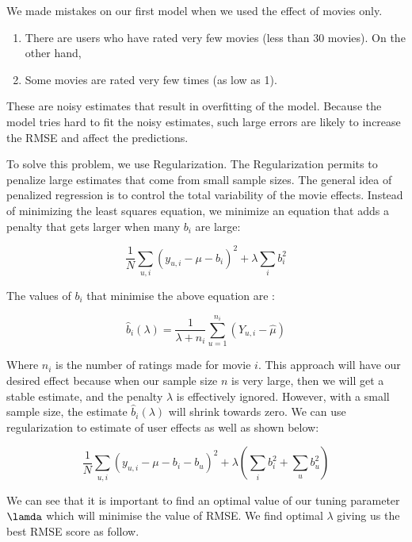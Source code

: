 \documentclass[]{article}
\begin{document}
We made mistakes on our first model when we used the effect of movies
only.

\begin{enumerate}
\item There are users who have rated very few movies (less than 30 movies). On the other hand, 
\item Some movies are rated very few times (as low as 1). 
\end{enumerate}

These are noisy estimates that result in overfitting of the model.
Because the model tries hard to fit the noisy estimates, such large
errors are likely to increase the RMSE and affect the predictions.

To solve this problem, we use Regularization. The Regularization permits
to penalize large estimates that come from small sample sizes. The
general idea of penalized regression is to control the total variability
of the movie effects. Instead of minimizing the least squares equation,
we minimize an equation that adds a penalty that gets larger when many
\(b_{i}\) are large:

\begin{equation}
\frac{1}{N} \sum_{u,i} \left(y_{u,i} - \mu - b_i\right)^2 + \lambda \sum_{i} b_i^2
\end{equation}

The values of \(b_{i}\) that minimise the above equation are :

\begin{equation}
\hat{b}_i(\lambda) = \frac{1}{\lambda + n_i} \sum_{u=1}^{n_i} \left(Y_{u,i} - \hat{\mu}\right)
\end{equation}

Where \(n_{i}\) is the number of ratings made for movie \(i\). This
approach will have our desired effect because when our sample size \(n\)
is very large, then we will get a stable estimate, and the penalty
\(\lambda\) is effectively ignored. However, with a small sample size,
the estimate \(\hat{b}_i(\lambda)\) will shrink towards zero. We can use
regularization to estimate of user effects as well as shown below:

\begin{equation}
\frac{1}{N} \sum_{u,i} \left(y_{u,i} - \mu - b_i - b_u \right)^2 + 
\lambda \left(\sum_{i} b_i^2 + \sum_{u} b_u^2\right)
\end{equation}

We can see that it is important to find an optimal value of our tuning
parameter \(\lamda\) which will minimise the value of RMSE. We find
optimal \(\lambda\) giving us the best RMSE score as follow.
\end{document}
